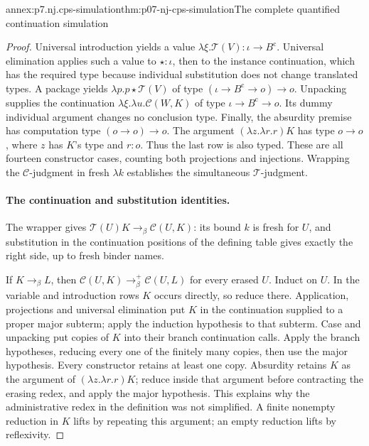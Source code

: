 \begin{annexitem}{annex:p7.nj.cps-simulation}{thm:p07-nj-cps-simulation}{The complete quantified continuation simulation}
\begin{proof}
Universal introduction yields a value
\(\lambda\xi.\mathcal T(V):\iota\to B^{\mathrm c}\).
Universal elimination applies such a value to
\(\star:\iota\), then to the instance continuation, which
has the required type because individual substitution does
not change translated types. A package yields
\(\lambda p.p\star\mathcal T(V)\) of type
\((\iota\to B^{\mathrm c}\to o)\to o\).
Unpacking supplies the continuation
\(\lambda\xi.\lambda u.\mathcal C(W,K)\) of type
\(\iota\to B^{\mathrm c}\to o\). Its dummy individual
argument changes no conclusion type. Finally, the absurdity
premise has computation type \((o\to o)\to o\).
The argument \((\lambda z.\lambda r.r)K\) has type
\(o\to o\), where \(z\) has \(K\)'s type and \(r:o\).
Thus the last row is also typed. These are all fourteen
constructor cases, counting both projections and injections.
Wrapping the \(\mathcal C\)-judgment in fresh \(\lambda k\)
establishes the simultaneous \(\mathcal T\)-judgment.

\paragraph{The continuation and substitution identities.}
The wrapper gives \(\mathcal T(U)K\to_\beta\mathcal C(U,K)\):
its bound \(k\) is fresh for \(U\), and substitution in the
continuation positions of the defining table gives exactly
the right side, up to fresh binder names.

If \(K\to_\beta L\), then
\(\mathcal C(U,K)\to_\beta^+\mathcal C(U,L)\) for every
erased \(U\). Induct on \(U\). In the variable and
introduction rows \(K\) occurs directly, so reduce there.
Application, projections and universal elimination put \(K\)
in the continuation supplied to a proper major subterm;
apply the induction hypothesis to that subterm. Case and
unpacking put copies of \(K\) into their branch continuation
calls. Apply the branch hypotheses, reducing every one of
the finitely many copies, then use the major hypothesis.
Every constructor retains at least one copy. Absurdity retains
\(K\) as the argument of \((\lambda z.\lambda r.r)K\);
reduce inside that argument before contracting the erasing
redex, and apply the major hypothesis. This explains why
the administrative redex in the definition was not simplified.
A finite nonempty reduction in \(K\) lifts by repeating this
argument; an empty reduction lifts by reflexivity.


\end{proof}
\end{annexitem}
